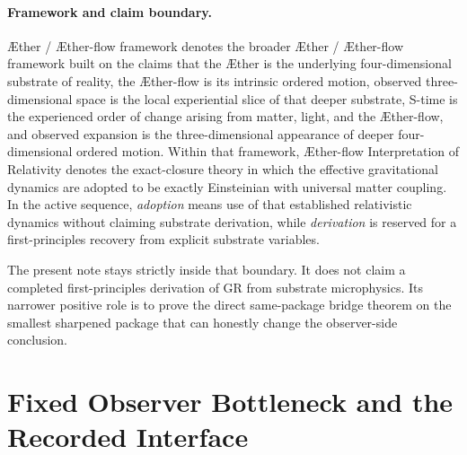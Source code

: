 \documentclass[11pt]{article}
\newcommand{\Aether}{\AE{}ther}
\newcommand{\Aflow}{\AE{}ther-flow}
\newcommand{\TheoryName}{\Aflow{} Interpretation of Relativity}
\newcommand{\TheoryProgram}{\Aether{} / \Aflow{} framework}
\begin{document}
\paragraph{Framework and claim boundary.}
\TheoryProgram{} denotes the broader \Aether{} / \Aflow{} framework built on the claims that the \Aether{} is the underlying four-dimensional substrate of reality, the \Aflow{} is its intrinsic ordered motion, observed three-dimensional space is the local experiential slice of that deeper substrate, S-time is the experienced order of change arising from matter, light, and the \Aflow{}, and observed expansion is the three-dimensional appearance of deeper four-dimensional ordered motion. Within that framework, \TheoryName{} denotes the exact-closure theory in which the effective gravitational dynamics are adopted to be exactly Einsteinian with universal matter coupling. In the active sequence, \emph{adoption} means use of that established relativistic dynamics without claiming substrate derivation, while \emph{derivation} is reserved for a first-principles recovery from explicit substrate variables.

The present note stays strictly inside that boundary. It does not claim a completed first-principles derivation of GR from substrate microphysics. Its narrower positive role is to prove the direct same-package bridge theorem on the smallest sharpened package that can honestly change the observer-side conclusion.

\section{Fixed Observer Bottleneck and the Recorded Interface}
\end{document}
